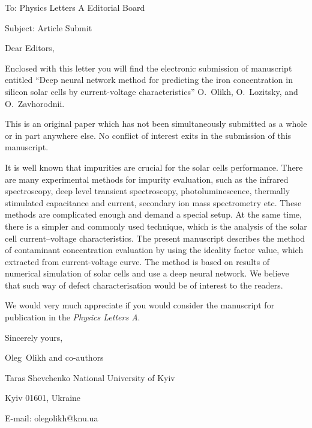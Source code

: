 \documentclass[preprint]{elsarticle}
\begin{document}
To:
Physics Letters A  Editorial Board


Subject:
Article Submit

\vspace{5mm}
Dear Editors,

\vspace{3mm}
Enclosed with this letter you will find the electronic submission of manuscript entitled
``Deep neural network method for predicting the iron concentration in silicon solar cells by current-voltage characteristics'' O.~Olikh, O.~Lozitsky, and O.~Zavhorodnii.



This is an original paper which has not been simultaneously submitted as a whole or in part anywhere else.
No conflict of interest exits in the submission of this manuscript.


It is well known that impurities are crucial for the solar cells performance.
There are many experimental methods for impurity evaluation, such as the infrared spectroscopy, deep level transient spectroscopy, photoluminescence, thermally stimulated capacitance and current, secondary ion mass spectrometry etc.
These methods are complicated enough and demand a special setup.
At the same time, there is a simpler and commonly used technique, which
is the analysis of the solar cell current--voltage characteristics.
The present manuscript describes the method of contaminant concentration evaluation by
using the ideality factor value, which extracted from current-voltage curve.
The method is based on results of numerical simulation of solar cells and use a deep neural network.
We believe that such way of defect characterisation would be of interest to the readers.

We would  very much appreciate if you would consider the manuscript for publication in the \emph{Physics Letters A}.

\vspace{3mm}

Sincerely yours,

Oleg~Olikh and co-authors


Taras Shevchenko National University of Kyiv


Kyiv 01601, Ukraine

E-mail: olegolikh@knu.ua


\end{document}
